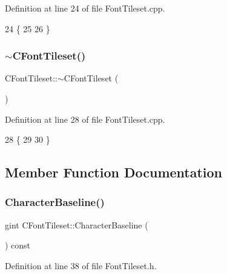 Definition at line 24 of file Font\+Tileset.\+cpp.


\begin{DoxyCode}
24                           \{
25     
26 \}
\end{DoxyCode}
\hypertarget{classCFontTileset_a615232874cd33ae3d5f92ec836bf1f0b}{}\label{classCFontTileset_a615232874cd33ae3d5f92ec836bf1f0b} 
\subsubsection{\texorpdfstring{$\sim$\+C\+Font\+Tileset()}{~CFontTileset()}}
{\footnotesize\ttfamily C\+Font\+Tileset\+::$\sim$\+C\+Font\+Tileset (\begin{DoxyParamCaption}{ }\end{DoxyParamCaption})\hspace{0.3cm}{\ttfamily [virtual]}}



Definition at line 28 of file Font\+Tileset.\+cpp.


\begin{DoxyCode}
28                            \{
29 
30 \}
\end{DoxyCode}


\subsection{Member Function Documentation}
\hypertarget{classCFontTileset_a888dd4fe8f46b35550386a1997f4376a}{}\label{classCFontTileset_a888dd4fe8f46b35550386a1997f4376a} 
\subsubsection{\texorpdfstring{Character\+Baseline()}{CharacterBaseline()}}
{\footnotesize\ttfamily gint C\+Font\+Tileset\+::\+Character\+Baseline (\begin{DoxyParamCaption}{ }\end{DoxyParamCaption}) const\hspace{0.3cm}{\ttfamily [inline]}}



Definition at line 38 of file Font\+Tileset.\+h.


